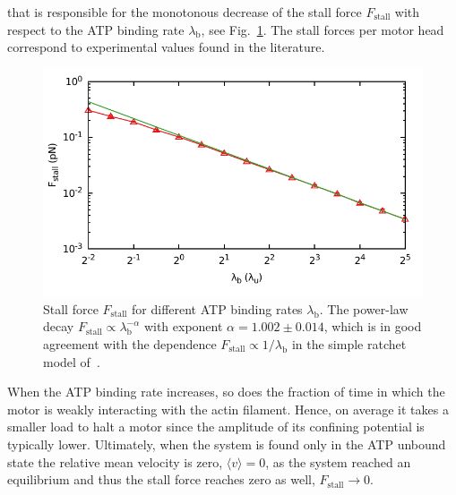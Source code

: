 \documentclass[aps,pre,twocolumn,showpacs,showkeys,superscriptaddress,floatfix]{revtex4-1}
\begin{document}
that is responsible for the monotonous decrease of the stall force $F_\text{stall}$ with respect to the ATP binding rate $\lambda_\text{b}$, see Fig.~\ref{fig:k_Fstall}. The stall forces per motor head correspond to experimental values found in the literature\cite{kishino1988force,finer1994single}.
\begin{figure}[t]
\centering
\includegraphics[width=0.9\linewidth,height=!]{k_Fstall}
\caption{
\label{fig:k_Fstall} 
Stall force $F_\text{stall}$ for different ATP binding rates $\lambda_\text{b}$.
The power-law decay $F_\text{stall} \propto \lambda_\text{b}^{-\alpha}$ with exponent $\alpha = 1.002 \pm 0.014$,
which is in good agreement with the dependence $F_\text{stall} \propto 1 / \lambda_\text{b}$ in the simple ratchet model of~\cite{astumian1996mechanochemical}. 
}
\end{figure}
When the ATP binding rate increases, so does the fraction of time in which the motor is weakly interacting with the actin filament. 
Hence, on average it takes a smaller load to halt a motor since the amplitude of its confining potential is typically lower.
Ultimately, when the system is found only in the ATP unbound state the relative mean velocity is zero, $\langle v \rangle = 0$, as the system reached an equilibrium 
and thus the stall force reaches zero as well, $F_\text{stall} \to 0$.
\end{document}
